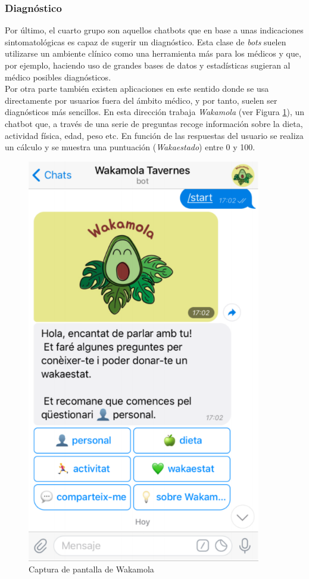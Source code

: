 \subsubsection{Diagnóstico}
Por último, el cuarto grupo son aquellos chatbots que en base a unas indicaciones sintomatológicas es capaz de sugerir un diagnóstico. Esta clase de \textit{bots} suelen utilizarse un ambiente clínico como una herramienta más para los médicos y que, por ejemplo, haciendo uso de grandes bases de datos y estadísticas sugieran al médico posibles diagnósticos.\\

Por otra parte también existen aplicaciones en este sentido donde se usa directamente por usuarios fuera del ámbito médico, y por tanto, suelen ser diagnósticos más sencillos. En esta dirección trabaja \textit{Wakamola} \cite{wakamola} (ver Figura \ref{fig:x captura wakamola}), un chatbot que, a través de una serie de preguntas recoge información sobre la dieta, actividad física, edad, peso etc. En función de las respuestas del usuario se realiza un cálculo y se muestra una puntuación (\textit{Wakaestado}) entre 0 y 100.

\begin{figure}[htbp]
\centering
\includegraphics[scale=0.5]{../images/wakamola.png} 
\caption{Captura de pantalla de Wakamola}
\label{fig:x captura wakamola}
\end{figure}

